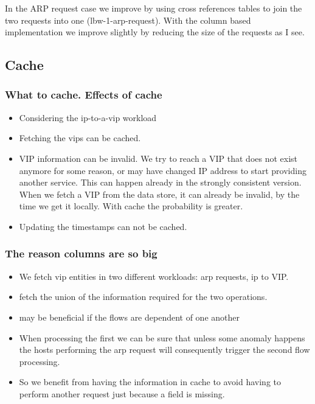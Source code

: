 In the ARP request case  we improve by using cross references tables
to join the two requests into one (lbw-1-arp-request). With the column
based implementation we improve slightly by reducing the size of the
requests as I see.

\subsection{Cache}

\subsubsection{What to cache. Effects of cache}

\begin{itemize}
\item Considering the ip-to-a-vip workload
\item Fetching the vips  can be cached. 

\item VIP information can be invalid. We try to reach a VIP that does not
  exist anymore for some reason, or may have changed IP address to
  start providing another service. This can happen already in the
  strongly consistent version. When we fetch a VIP from the data
  store, it can already be invalid, by the time we get it
  locally. With cache the probability is greater.  

\item Updating the timestamps can not be cached. 
\end{itemize}

\subsubsection{The reason columns are so big}
\begin{itemize}
\item We fetch \gls{vip} entities in two different workloads: arp
  requests, ip to VIP. 
\item fetch the union of the information required for the two
operations.
\item may be beneficial if the flows are dependent of one another
\item  When processing the first we can be sure that unless some
anomaly happens the hosts performing the arp request will consequently
trigger the second flow processing.
\item So we benefit from having the
information in cache to avoid having to perform another request just
because a field is missing. 
\end{itemize}

